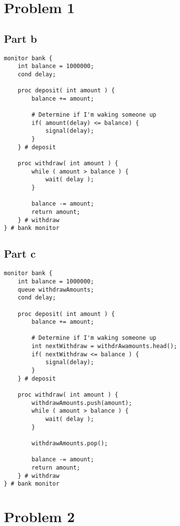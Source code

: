 \documentclass{article}%
\begin{document}
\section*{Problem 1}

\lstset{language=Python}
\subsection*{Part b}

\begin{lstlisting}[frame=single]
monitor bank {
    int balance = 1000000;
    cond delay;

    proc deposit( int amount ) {
        balance += amount;

        # Determine if I'm waking someone up
        if( amount(delay) <= balance) {
            signal(delay);
        }
    } # deposit

    proc withdraw( int amount ) {
        while ( amount > balance ) {
            wait( delay );
        }

        balance -= amount;
        return amount;
    } # withdraw
} # bank monitor
\end{lstlisting}

\subsection*{Part c}

\begin{lstlisting}[frame=single]
monitor bank {
    int balance = 1000000;
    queue withdrawAmounts;
    cond delay;

    proc deposit( int amount ) {
        balance += amount;

        # Determine if I'm waking someone up
        int nextWithdraw = withdrAwamounts.head();
        if( nextWithdraw <= balance ) {
            signal(delay);
        }
    } # deposit

    proc withdraw( int amount ) {
        withdrawAmounts.push(amount);
        while ( amount > balance ) {
            wait( delay );
        }

        withdrawAmounts.pop();

        balance -= amount;
        return amount;
    } # withdraw
} # bank monitor
\end{lstlisting}

\section*{Problem 2}
\end{document}
